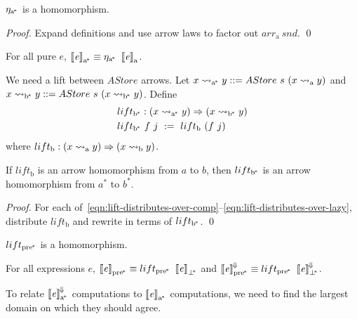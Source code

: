 \documentclass{llncs}
\newcommand{\arrow}{\rightsquigarrow}
\newcommand{\conv}{^{\mspace{-2mu}\Downarrow\mspace{-2mu}}}
\newcommand{\meaningofconv}[1]{\left\llbracket{#1}\right\rrbracket\conv}
\newcommand{\arrowlift}{\ensuremath{lift}}
\newcommand{\arrowarr}{\ensuremath{arr}}
\newcommand{\arrowtrans}{\ensuremath{\eta}}
\newcommand{\gen}{_\mathrm{a}}
\newcommand{\genb}{_\mathrm{b}}
\newcommand{\genc}{_\mathrm{a^{\mspace{-2mu}*}}}
\newcommand{\gend}{_\mathrm{b^{\mspace{-2mu}*}}}
\newcommand{\pbot}{{\bot^{\mspace{-4mu}*}}}
\newcommand{\ppre}{_\mathrm{pre^{\mspace{-2mu}*}}}
\newcommand{\liftppre}{\arrowlift\ppre}
\begin{document}
\begin{theorem}
$\arrowtrans\genc$ is a homomorphism.
\end{theorem}
\begin{proof}
Expand definitions and use arrow laws to factor out $\arrowarr\gen~snd$.
\qed
\end{proof}

\begin{corollary}
\label{cor:pure-astore-semantic-correctness}
For all pure $\mathit{e}$, $\meaningof{\mathit{e}}\genc \equiv \arrowtrans\genc~\meaningof{\mathit{e}}\gen$.
\end{corollary}

We need a lift between $AStore$ arrows.
Let $x \arrow\genc y ::= AStore~s~(x \arrow\gen y)$ and $x \arrow\gend y ::= AStore~s~(x \arrow\gend y)$.
Define
\begin{equation}
\begin{aligned}
	&\arrowlift\gend : (x \arrow\genc y) \tto (x \arrow\gend y) \\
	&\arrowlift\gend~f~j \ := \ \arrowlift\genb~(f~j)
\end{aligned}
\end{equation}
where $\arrowlift\genb : (x \arrow\gen y) \tto (x \arrow\genb y)$.

\begin{theorem}
If $\arrowlift\genb$ is an arrow homomorphism from $a$ to $b$, then $\arrowlift\gend$ is an arrow homomorphism from $a^*$ to $b^*$.
\end{theorem}
\begin{proof}
For each of~\eqref{eqn:lift-distributes-over-comp}--\eqref{eqn:lift-distributes-over-lazy}, distribute $\arrowlift\genb$ and rewrite in terms of $\arrowlift\gend$.
\qed
\end{proof}

\begin{corollary}
$\liftppre$ is a homomorphism.
\end{corollary}

\begin{corollary}
For all expressions $\mathit{e}$, $\meaningof{\mathit{e}}\ppre \equiv \liftppre~\meaningof{\mathit{e}}_\pbot$ and $\meaningofconv{\mathit{e}}\ppre \equiv \liftppre~\meaningofconv{\mathit{e}}_\pbot$.
\end{corollary}

To relate $\meaningofconv{\mathit{e}}\genc$ computations to $\meaningof{\mathit{e}}\genc$ computations, we need to find the largest domain on which they should agree.
\end{document}
